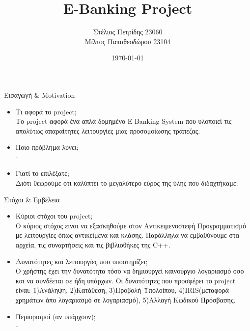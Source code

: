 \documentclass{beamer}
\title{E-Banking Project}
\author{Στέλιος Πετρίδης 23060 \\
Μίλτος Παπαθεοδώρου 23104}
\date{\today}
\begin{document}
\frame{\titlepage}

\begin{frame}{Εισαγωγή \& Motivation}
\begin{itemize}
  \item Τι αφορά το project;
  \vspace{0.2cm}
   \\ Το project αφορά ένα απλά δομημένο E-Banking System που υλοποιεί τις απολύτως απαραίτητες λειτουργίες μιας προσομοίωσης τράπεζας.
   \vspace{0.5cm}
  \item Ποιο πρόβλημα λύνει;
  \\ - 
  \vspace{0.5cm}
  \item Γιατί το επιλέξατε;
  \vspace{0.2cm}
  \\ Διότι θεωρούμε οτι καλύπτει το μεγαλύτερο εύρος της ύλης που διδαχτήκαμε.
\end{itemize}
\end{frame}

\begin{frame}{Στόχοι \& Εμβέλεια}
\begin{itemize}
  \item Κύριοι στόχοι του project;
  \vspace{0.2cm}
  \\ Ο κύριος στόχος ειναι να εξασκηθούμε στον Αντικειμενοστεφή Προγραμματισμό με λειτουργίες όπως αντικείμενα και κλάσης. Παράλληλα να εμβαθύνουμε στα αρχεία, τις συναρτήσεις και τις βιβλιοθήκες της C++.
  \vspace{0.5cm}
  \item Δυνατότητες και λειτουργίες που υποστηρίζει;
  \vspace{0.2cm}
  \\ Ο χρήστης έχει την δυνατότητα τόσο να δημιουργεί καινούργιο λογαριασμό οσο και να συνδέεται σε ήδη υπάρχων. Οι δυνατότητες που προσφέρει το project είναι: 1)Ανάληψη, 2)Κατάθεση, 3)Προβολή Υπολοίπου, 4)IRIS(μεταφορά χρημάτων άπο λογαριασμό σε λογαριασμό), 5)Αλλαγή Κωδικού Πρόσβασης.
  \vspace{0.5cm}
  \item Περιορισμοί (αν υπάρχουν);
  \vspace{0.1cm}
  \\ -
\end{itemize}
\end{frame}
\end{document}
